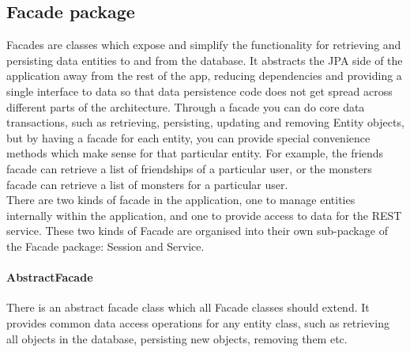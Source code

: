 \subsection{Facade package}
Facades are classes which expose and simplify the functionality for retrieving and persisting data entities to and from the database. It abstracts the JPA side of the application away from the rest of the app, reducing dependencies and providing a single interface to data so that data persistence code does not get spread across different parts of the architecture. Through a facade you can do core data transactions, such as retrieving, persisting, updating and removing Entity objects, but by having a facade for each entity, you can provide special convenience methods which make sense for that particular entity. For example, the friends facade can retrieve a list of friendships of a particular user, or the monsters facade can retrieve a list of monsters for a particular user.\\
There are two kinds of facade in the application, one to manage entities internally within the application, and one to provide access to data for the REST service. These two kinds of Facade are organised into their own sub-package of the Facade package: Session and Service.

\paragraph{AbstractFacade}
There is an abstract facade class which all Facade classes should extend. It provides common data access operations for any entity class, such as retrieving all objects in the database, persisting new objects, removing them etc.

